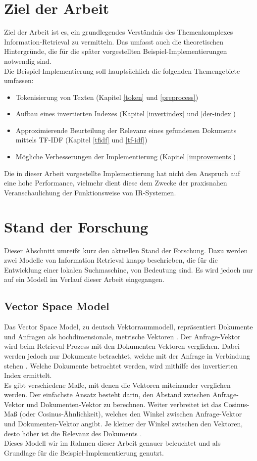 \section{Ziel der Arbeit}
Ziel der Arbeit ist es, ein grundlegendes Verständnis des Themenkomplexes Information-Retrieval zu vermitteln. Das umfasst auch die theoretischen Hintergründe, die für die später vorgestellten Beispiel-Implementierungen notwendig sind.
\\
Die Beispiel-Implementierung soll hauptsächlich die folgenden Themengebiete umfassen:
\begin{itemize}
	\item Tokenisierung von Texten (Kapitel \ref{token} und \ref{preprocess})
	\item Aufbau eines invertierten Indexes (Kapitel \ref{invertindex} und \ref{der-index})
	\item Approximierende Beurteilung der Relevanz eines gefundenen Dokuments mittels TF-IDF (Kapitel \ref{tfidf} und \ref{tf-idf})
	\item Mögliche Verbesserungen der Implementierung (Kapitel \ref{improvements})
\end{itemize}
Die in dieser Arbeit vorgestellte Implementierung hat nicht den Anspruch auf eine hohe Performance, vielmehr dient diese dem Zwecke der praxisnahen Veranschaulichung der Funktionsweise von IR-Systemen.

\section{Stand der Forschung}
Dieser Abschnitt umreißt kurz den aktuellen Stand der Forschung. Dazu werden zwei Modelle von Information Retrieval knapp beschrieben, die für die Entwicklung einer lokalen Suchmaschine, von Bedeutung sind. Es wird jedoch nur auf ein Modell im Verlauf dieser Arbeit eingegangen.

\subsection{Vector Space Model}
Das Vector Space Model, zu deutsch Vektorraummodell, repräsentiert Dokumente und Anfragen als hochdimensionale, metrische Vektoren \cite{VR_Retrieval}.
Der Anfrage-Vektor wird beim Retrieval-Prozess mit den Dokumenten-Vektoren verglichen. Dabei werden jedoch nur Dokumente betrachtet, welche mit der Anfrage in Verbindung stehen \cite{klass_IR}. Welche Dokumente betrachtet werden, wird mithilfe des invertierten Index ermittelt.
\\
Es gibt verschiedene Maße, mit denen die Vektoren miteinander verglichen werden. Der einfachste Ansatz besteht darin, den Abstand zwischen Anfrage-Vektor und Dokumenten-Vektor zu berechnen. Weiter verbreitet ist das Cosinus-Maß (oder Cosinus-Ähnlichkeit), welches den Winkel zwischen Anfrage-Vektor und Dokumenten-Vektor angibt. Je kleiner der Winkel zwischen den Vektoren, desto höher ist die Relevanz des Dokuments \cite{IR_Uni_Duisburg}.
\\
Dieses Modell wir im Rahmen dieser Arbeit genauer beleuchtet und als Grundlage für die Beispiel-Implementierung genutzt.

